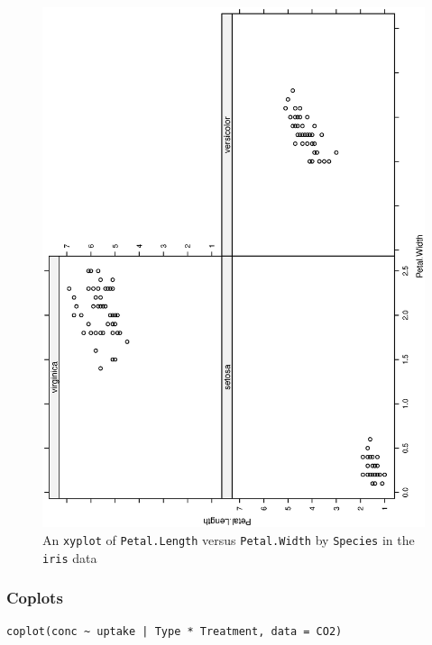 \documentclass[captions=tableheading]{scrbook}
\begin{document}
\begin{figure}[th]
  \includegraphics[angle=270, totalheight=4in]{ps/datadesc/xyplot.ps}
  \caption[An \texttt{xyplot} of \texttt{Petal.Length} versus \texttt{Petal.Width} by \texttt{Species}]{An \texttt{xyplot} of \texttt{Petal.Length} versus \texttt{Petal.Width} by \texttt{Species} in the \texttt{iris} data}
  \label{fig-xyplot}
\end{figure}
\subsubsection{Coplots}
\label{sec-3-6-3-4}



\begin{verbatim}
coplot(conc ~ uptake | Type * Treatment, data = CO2)
\end{verbatim}
\end{document}
